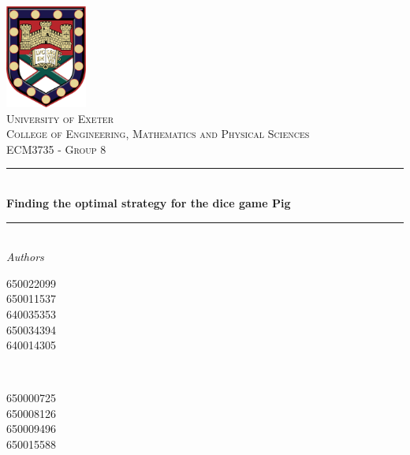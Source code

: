 \documentclass[a4paper,titlepage]{article}
\begin{document}
\begin{titlepage}
	\newcommand{\HRule}{\rule{\linewidth}{0.5mm}}
	\center


	\includegraphics[width=0.2\textwidth]{Crest.jpg}\\[1cm]


	\textsc{\LARGE University of Exeter}\\[1.5cm]

	\textsc{\Large College of Engineering, Mathematics and Physical Sciences}\\[0.5cm]

	\textsc{\large ECM3735 - Group 8}\\[0.5cm]


	\HRule\\[0.4cm]

	{\huge\bfseries Finding the optimal strategy for the dice game Pig}\\[0.4cm]

	\HRule\\[1.5cm]


	\LARGE\textit{Authors}\\
	\begin{minipage}{0.4\textwidth}
		\begin{flushleft}
			\large
			\textsc{650022099}\\
			\textsc{650011537}\\
			\textsc{640035353}\\
			\textsc{650034394}\\
			\textsc{640014305}
		\end{flushleft}
	\end{minipage}
	~
	\begin{minipage}{0.4\textwidth}
		\begin{flushright}
			\large
		     \textsc{650000725}\\
			 \textsc{650008126}\\
			 \textsc{650009496}\\
			 \textsc{650015588}\\
			\vspace*{10pt§}
		\end{flushright}
	\end{minipage}


\end{titlepage}
\end{document}

